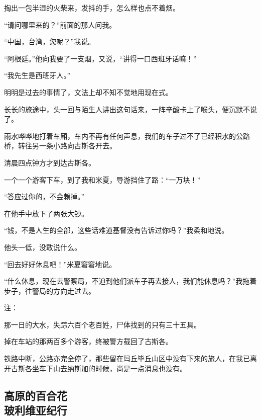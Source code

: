 \par 掏出一包半湿的火柴来，发抖的手，怎么样也点不着烟。
\par “请问哪里来的？”前面的那人问我。
\par “中国，台湾，您呢？”我说。
\par “阿根廷。”他向我要了一支烟，又说，“讲得一口西班牙话嘛！”
\par “我先生是西班牙人。”
\par 明明是过去的事情了，文法上却不知不觉地用现在式。
\par 长长的旅途中，头一回与陌生人讲出这句话来，一阵辛酸卡上了喉头，便沉默不说了。
\par 雨水哗哗地打着车厢，车内不再有任何声息，我们的车子过不了已经积水的公路桥，转往另一条小路向古斯各开去。
\par 清晨四点钟方才到达古斯各。
\par 一个一个游客下车，到了我和米夏，导游挡住了路：“一万块！”
\par “答应过你的，不会赖掉。”
\par 在他手中放下了两张大钞。
\par “钱，不是人生的全部，这些话难道基督没有告诉过你吗？”我柔和地说。
\par 他头一低，没敢说什么。
\par “回去好好休息吧！”米夏窘窘地说。
\par “什么休息，现在去警察局，不迫到他们派车子再去接人，我们能休息吗？”我拖着步子，往警局的方向走过去。
\par 注：
\par 那一日的大水，失踪六百个老百姓，尸体找到的只有三十五具。
\par 掉在车站的那两百多个游客，终被警方载回了古斯各。
\par 铁路中断，公路亦完全停了，那些留在玛丘毕丘山区中没有下来的旅人，在我已离开古斯各坐车下山去纳斯加的时候，尚是一点消息也没有。



\subsection{高原的百合花\\\small{玻利维亚纪行}}

